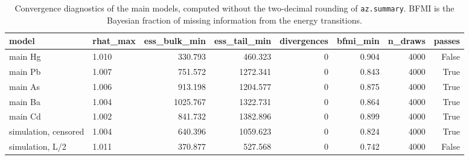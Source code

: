 \begin{table}[htbp]
\centering
\caption{Convergence diagnostics of the main models, computed without the two-decimal rounding of \texttt{az.summary}. BFMI is the Bayesian fraction of missing information from the energy transitions.}
\label{tab:conv}
\footnotesize
\begin{tabular}{llrrrrrr}
\toprule
model & rhat\_max & ess\_bulk\_min & ess\_tail\_min & divergences & bfmi\_min & n\_draws & passes \\
\midrule
main Hg & 1.010 & 330.793 & 460.323 & 0 & 0.904 & 4000 & False \\
main Pb & 1.007 & 751.572 & 1272.341 & 0 & 0.843 & 4000 & True \\
main As & 1.006 & 913.198 & 1204.577 & 0 & 0.875 & 4000 & True \\
main Ba & 1.004 & 1025.767 & 1322.731 & 0 & 0.864 & 4000 & True \\
main Cd & 1.002 & 841.732 & 1382.896 & 0 & 0.899 & 4000 & True \\
simulation, censored & 1.004 & 640.396 & 1059.623 & 0 & 0.824 & 4000 & True \\
simulation, L/2 & 1.011 & 370.877 & 527.568 & 0 & 0.742 & 4000 & False \\
\bottomrule
\end{tabular}
\end{table}
